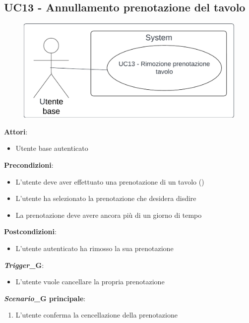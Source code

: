 \subsection{UC13 - Annullamento prenotazione del tavolo} \label{usecase:13}
\begin{figure}[H]
\centering
\includegraphics[width=0.75\linewidth]{ucd/ucd13.png}
\end{figure}
\textbf{Attori}:
\begin{itemize}
    \item Utente base autenticato
\end{itemize}
\textbf{Precondizioni}:
\begin{itemize}
    \item L'utente deve aver effettuato una prenotazione di un tavolo ()
    \item L'utente ha selezionato la prenotazione che desidera disdire
    \item La prenotazione deve avere ancora più di un giorno di tempo
\end{itemize}
\textbf{Postcondizioni}:
\begin{itemize}
    \item L'utente autenticato ha rimosso la sua prenotazione
\end{itemize}
\textbf{\textit{Trigger}_G}:
\begin{itemize}
    \item L'utente vuole cancellare la propria prenotazione
\end{itemize}
\textbf{\textit{Scenario}_G principale}:
\begin{enumerate}
    \item L'utente conferma la cencellazione della prenotazione
\end{enumerate}
\newpage